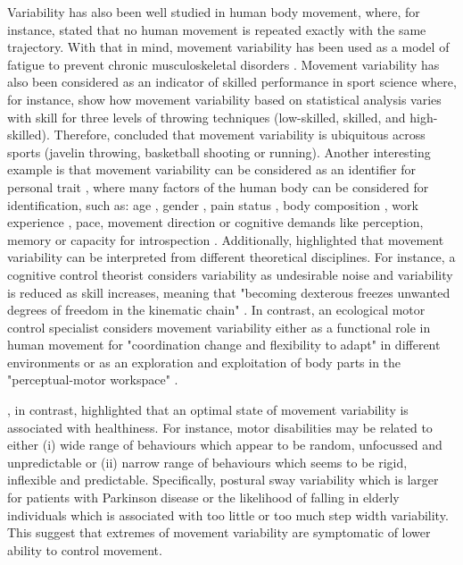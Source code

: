 Variability has also been well studied in human body movement, where, 
for instance, \cite{bernstein1967} stated that no human movement is 
repeated exactly with the same trajectory.
With that in mind, movement variability has been used as a model of fatigue 
to prevent chronic musculoskeletal disorders 
\citep{mathiassen2006, srinivasan2012}. 
Movement variability has also been considered as an indicator of skilled 
performance in sport science where, for instance, 
\cite{wagner2012} show how movement variability based on statistical 
analysis varies with skill for three levels of throwing techniques 
(low-skilled, skilled, and high-skilled).
Therefore, \cite{bartlett2007} concluded that movement variability is 
ubiquitous across sports (javelin throwing, basketball shooting or running).
Another interesting example is that movement variability can be considered 
as an identifier for personal trait \citep{sandlund2017}, 
where many factors of the human body can be considered for identification, 
such as:
age \citep{kruger2013, macdonald2006, vaillancourt2003, stergiou2016},
gender \citep{svendsen2010},
pain status \citep{madeleine2008, sandlund2008},
body composition  \citep{chiari2002},
work experience \citep{madeleine2009},
pace, movement direction or cognitive demands  
like perception, memory or capacity for introspection 
\citep{srinivasan2012, kanai2011}.
Additionally, \cite{bartlett2007} highlighted that movement variability 
can be interpreted from different theoretical disciplines.
For instance, a cognitive control theorist considers variability as 
undesirable noise and variability is reduced as skill increases, meaning 
that "becoming dexterous freezes unwanted degrees of freedom in the 
kinematic chain" \citep[p. 238]{bartlett2007}.
In contrast, an ecological motor control specialist considers movement 
variability either as a functional role in human movement for 
"coordination change and flexibility to adapt" in different 
environments \citep[p. 238]{bartlett2007} or 
as an exploration and exploitation of body parts in the 
"perceptual-motor workspace" \citep{wu2014, herzfeld2014}.

\cite{stergiou2011}, in contrast, highlighted that an optimal state 
of movement variability is associated with healthiness.
For instance, motor disabilities may be related to either 
(i) wide range of behaviours which appear to be random, unfocussed and 
unpredictable or (ii) narrow range of behaviours which seems to be rigid, 
inflexible and predictable. 
Specifically, postural sway variability which is larger for patients 
with Parkinson disease or the likelihood of falling in elderly individuals 
which is associated with too little or too much step width variability.
This suggest that extremes of movement variability are symptomatic of 
lower ability to control movement.
 

